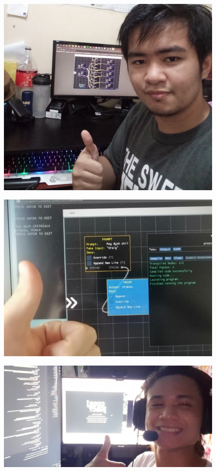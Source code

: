 \clearpage
{}

\begin{figure}[H]
	 \centering
	 \includegraphics[width=\textwidth]{evaluators/tech/f_rwc.jpg}
\end{figure}
\begin{figure}[H]
	 \centering
	 \includegraphics[width=\textwidth]{evaluators/tech/d_a13.jpg}
\end{figure}
\begin{figure}[H]
	 \centering
	 \includegraphics[width=\textwidth]{evaluators/tech/f_un.jpg}
\end{figure}
